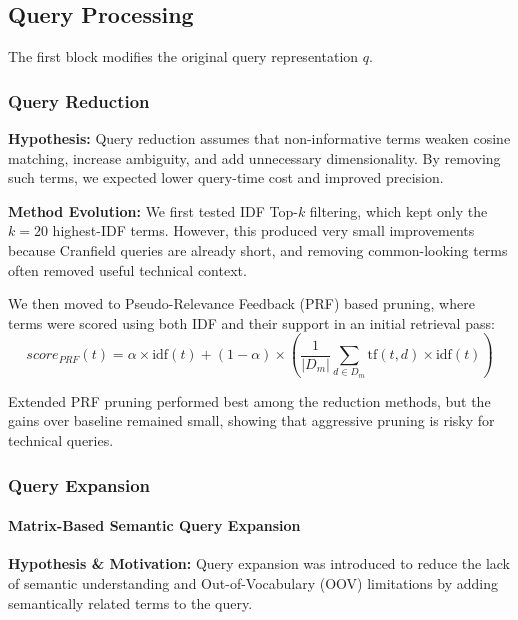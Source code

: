 \documentclass[runningheads]{llncs}
\begin{document}
\subsection{Query Processing}

The first block modifies the original query representation $q$.

\subsubsection{Query Reduction}

\textbf{Hypothesis:}  
Query reduction assumes that non-informative terms weaken cosine matching, increase ambiguity, and add unnecessary dimensionality. By removing such terms, we expected lower query-time cost and improved precision.

\textbf{Method Evolution:}  
We first tested IDF Top-$k$ filtering, which kept only the $k=20$ highest-IDF terms. However, this produced very small improvements because Cranfield queries are already short, and removing common-looking terms often removed useful technical context.

We then moved to Pseudo-Relevance Feedback (PRF) based pruning, where terms were scored using both IDF and their support in an initial retrieval pass:
\begin{equation}
score_{PRF}(t) = \alpha \times \text{idf}(t) + (1 - \alpha) \times \left( \frac{1}{|D_m|} \sum_{d \in D_m} \text{tf}(t, d) \times \text{idf}(t) \right)
\end{equation}

Extended PRF pruning performed best among the reduction methods, but the gains over baseline remained small, showing that aggressive pruning is risky for technical queries.

\subsubsection{Query Expansion}

\paragraph{Matrix-Based Semantic Query Expansion}

\textbf{Hypothesis \& Motivation:}  
Query expansion was introduced to reduce the lack of semantic understanding and Out-of-Vocabulary (OOV) limitations by adding semantically related terms to the query.
\end{document}
